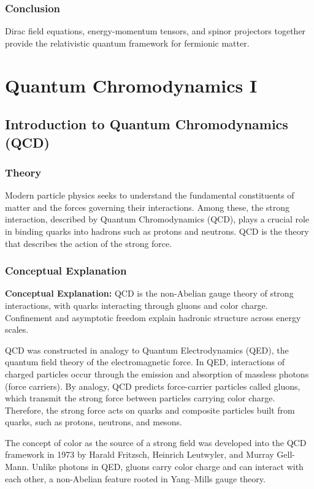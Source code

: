 \documentclass[12pt]{report}
\begin{document}
\subsection*{Conclusion}
Dirac field equations, energy-momentum tensors, and spinor projectors together provide the relativistic quantum framework for fermionic matter.


\chapter{Quantum Chromodynamics I}

\section{Introduction to Quantum Chromodynamics (QCD)}



\subsection*{Theory}
Modern particle physics seeks to understand the fundamental constituents of matter and the forces governing their interactions. Among these, the strong interaction, described by Quantum Chromodynamics (QCD), plays a crucial role in binding quarks into hadrons such as protons and neutrons. QCD is the theory that describes the action of the strong force.


\subsection{Conceptual Explanation}
\textbf{Conceptual Explanation:} QCD is the non-Abelian gauge theory of strong interactions, with quarks interacting through gluons and color charge. Confinement and asymptotic freedom explain hadronic structure across energy scales.


QCD was constructed in analogy to Quantum Electrodynamics (QED), the quantum field theory of the electromagnetic force. In QED, interactions of charged particles occur through the emission and absorption of massless photons (force carriers). By analogy, QCD predicts force-carrier particles called gluons, which transmit the strong force between particles carrying color charge. Therefore, the strong force acts on quarks and composite particles built from quarks, such as protons, neutrons, and mesons.

The concept of color as the source of a strong field was developed into the QCD framework in 1973 by Harald Fritzsch, Heinrich Leutwyler, and Murray Gell-Mann. Unlike photons in QED, gluons carry color charge and can interact with each other, a non-Abelian feature rooted in Yang--Mills gauge theory.
\end{document}

